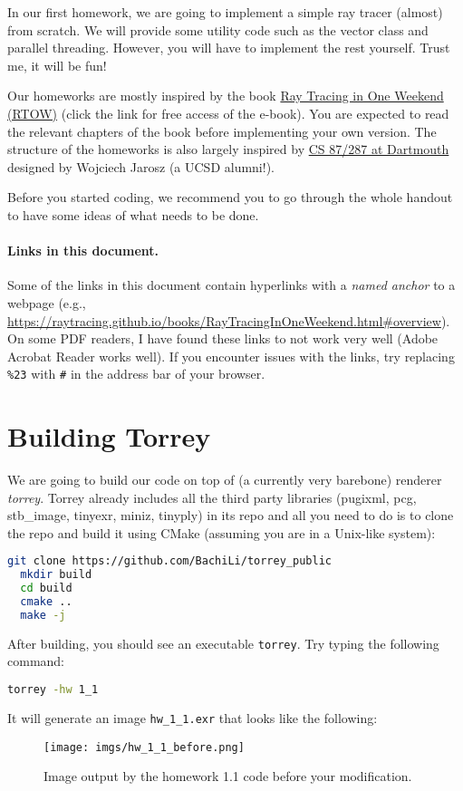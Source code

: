 



\setcounter{section}{-1}

In our first homework, we are going to implement a simple ray tracer (almost) from scratch.
We will provide some utility code such as the vector class and parallel threading. 
However, you will have to implement the rest yourself. Trust me, it will be fun!

Our homeworks are mostly inspired by the book \href{https://raytracing.github.io/}{Ray Tracing in One Weekend (RTOW)} (click the link for free access of the e-book). You are expected to read the relevant chapters of the book before implementing your own version. The structure of the homeworks is also largely inspired by \href{https://cs87-dartmouth.github.io/Fall2022/assignments.html}{CS 87/287 at Dartmouth} designed by Wojciech Jarosz (a UCSD alumni!).

Before you started coding, we recommend you to go through the whole handout to have some ideas of what needs to be done.

\paragraph{Links in this document.} Some of the links in this document contain hyperlinks with a \emph{named anchor} to a webpage (e.g., \url{https://raytracing.github.io/books/RayTracingInOneWeekend.html\#overview}). On some PDF readers, I have found these links to not work very well (Adobe Acrobat Reader works well). If you encounter issues with the links, try replacing \lstinline{%23} with \lstinline{#} in the address bar of your browser.

\section{Building Torrey}
We are going to build our code on top of (a currently very barebone) renderer \emph{torrey}. Torrey already includes all the third party libraries (pugixml, pcg, stb\_image, tinyexr, miniz, tinyply) in its repo and all you need to do is to clone the repo and build it using CMake (assuming you are in a Unix-like system):
\begin{lstlisting}[language=bash]
  git clone https://github.com/BachiLi/torrey_public
  mkdir build
  cd build
  cmake ..
  make -j
\end{lstlisting}

After building, you should see an executable \lstinline{torrey}. Try typing the following command:
\begin{lstlisting}[language=bash]
  torrey -hw 1_1
\end{lstlisting}
It will generate an image \lstinline{hw_1_1.exr} that looks like the following:
\begin{figure}[h]
    \centering
    \texttt{[image: imgs/hw\_1\_1\_before.png]}
    \caption{Image output by the homework 1.1 code before your modification.}
    \label{fig:hw_1_1_before}
\end{figure}

